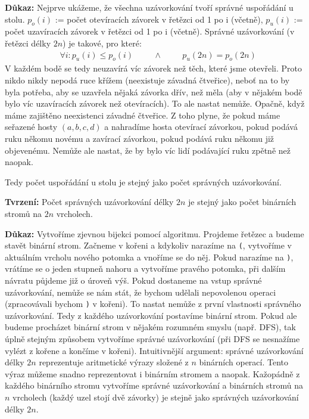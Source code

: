 \documentclass[a4paper]{article}
\newcommand{\n}{\newline}
\newcommand{\tab}{\hspace{1cm}}
\begin{document}
\vspace{0.3cm}
\textbf{Důkaz:}
Nejprve ukážeme, že všechna uzávorkování tvoří správné uspořádání u stolu. $p_o(i)$ := počet otevíracích závorek v řetězci od 1 po i (včetně), $p_u(i)$ := počet uzavíracích závorek v řetězci od 1 po i (včetně). Správné uzávorkování (v řetězci délky $2n$) je takové, pro které:
\begin{align*}
	& \forall i: p_u(i) \le p_o(i) \tab \wedge \tab p_u(2n) = p_o(2n)
\end{align*}
V každém bodě se tedy neuzavírá víc závorek než těch, které jsme otevřeli. Proto nikdo nikdy nepodá ruce křížem (neexistuje závadná čtveřice), neboť na to by byla potřeba, aby se uzavřela nějaká závorka dřív, než měla (aby v nějakém bodě bylo víc uzavíracích závorek než otevíracích). To ale nastat nemůže. \n
Opačně, když máme zajištěno neexistenci závadné čtveřice. Z toho plyne, že pokud máme seřazené hosty $(a, b, c, d)$ a nahradíme hosta otevírací závorkou, pokud podává ruku někomu novému a zavírací závorkou, pokud podává ruku někomu již objevenému. Nemůže ale nastat, že by bylo víc lidí podávající ruku zpětně než naopak.

Tedy počet uspořádání u stolu je stejný jako počet správných uzávorkování. \n

\textbf{Tvrzení:} Počet správných uzávorkování délky $2n$ je stejný jako počet binárních stromů na $2n$ vrcholech. \n

\textbf{Důkaz:} Vytvoříme zjevnou bijekci pomocí algoritmu. Projdeme řetězec a budeme stavět binární strom. Začneme v kořeni a kdykoliv narazíme na \texttt{(}, vytvoříme v aktuálním vrcholu nového potomka a vnoříme se do něj. Pokud narazíme na \texttt{)}, vrátíme se o jeden stupneň nahoru a vytvoříme pravého potomka, při dalším návratu půjdeme již o úroveň výš. Pokud dostaneme na vstup správné uzávorkování, nemůže se nám stát, že bychom udělali nepovolenou operaci (zpracovávali bychom \texttt{)} v kořeni). To nastat nemůže z první vlastnosti správného uzávorkování. Tedy z každého uzávorkování postavíme binární strom. Pokud ale budeme procházet binární strom v nějakém rozumném smyslu (např. DFS), tak úplně stejným způsobem vytvoříme správné uzávorkování (při DFS se nesnažíme vylézt z kořene a končíme v kořeni).\n
Intuitivnější argument: správné uzávorkování délky $2n$ reprezentuje aritmetické výrazy složené z $n$ binárních operací. Tento výraz můžeme snadno reprezentovat i binárním stromem a naopak. \n
Kažopádně z každého binárního stromu vytvoříme správné uzávorkování a binárních stromů na  $n$ vrcholech (každý uzel stojí dvě závorky) je stejně jako správných uzávorkování délky $2n$.
\n
\end{document}
